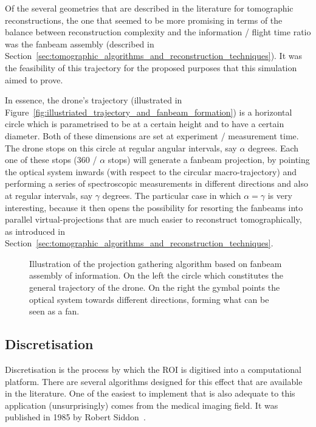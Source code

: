 Of the several geometries that are described in the literature for
tomographic reconstructions, the one that seemed to be more promising in
terms of the balance between reconstruction complexity and the
information / flight time ratio was the fanbeam assembly (described in
Section~\ref{sec:tomographic_algorithms_and_reconstruction_techniques}).
It was the feasibility of this trajectory for the proposed purposes that
this simulation aimed to prove.

In essence, the drone's trajectory (illustrated in
Figure~\ref{fig:illustriated_trajectory_and_fanbeam_formation}) is a
horizontal circle which is parametrised to be at a certain height and to
have a certain diameter.  Both of these dimensions are set at experiment
/ measurement time. The drone stops on this circle at regular angular
intervals, say $\alpha$ degrees. Each one of these stops (360 / $\alpha$
stops) will generate a fanbeam projection, by pointing the optical
system inwards (with respect to the circular macro-trajectory) and
performing a series of spectroscopic measurements in different
directions and also at regular intervals, say $\gamma$ degrees. The
particular case in which $\alpha = \gamma$ is very interesting, because
it then opens the possibility for resorting the fanbeams into parallel
virtual-projections that are much easier to reconstruct tomographically,
as introduced in
Section~\ref{sec:tomographic_algorithms_and_reconstruction_techniques}.  

\begin{figure}[htpb]
    \centering
    \missingfigure{}
    \caption{Illustration of the projection gathering algorithm based on
    fanbeam assembly of information. On the left the circle which
    constitutes the general trajectory of the drone. On the right the
    gymbal points the optical system towards different directions, forming
    what can be seen as a fan.}
    \label{fig:illustrated_trajectory_and_fanbeam_formation}
\end{figure}

\subsection{Discretisation}%
\label{sub:discretisation}

Discretisation is the process by which the \gls{ROI} is digitised into a
computational platform. There are several algorithms designed for this
effect that are available in the literature. One of the easiest to
implement that is also adequate to this application (unsurprisingly)
comes from the medical imaging field. It was published in 1985 by Robert
Siddon~\cite{Siddon1985}.

